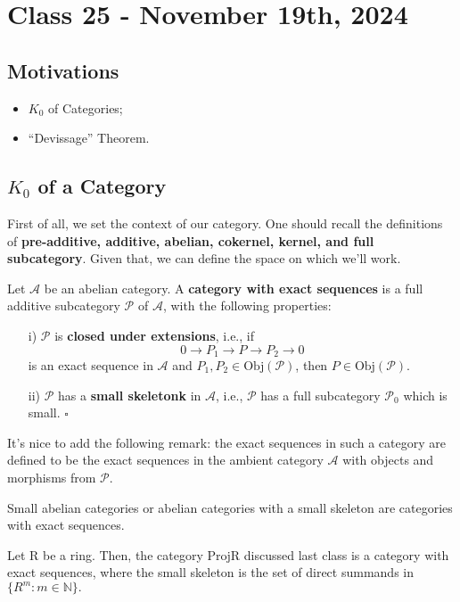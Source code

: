 \documentclass[../category_theory.tex]{subfiles}
\begin{document}
\section{Class 25 - November 19th, 2024}
\subsection{Motivations}
\begin{itemize}
	\item \(K_{0}\) of Categories;
	\item ``Devissage'' Theorem.
\end{itemize}
\subsection{\(K_{0}\) of a Category}
First of all, we set the context of our category. One should recall the definitions of \textbf{pre-additive, additive, abelian, cokernel, kernel, and full subcategory}.
Given that, we can define the space on which we'll work.
\begin{def*}
	Let \(\mathcal{A}\) be an abelian category. A \textbf{category with exact sequences} is a full additive subcategory \(\mathcal{P}\) of \(\mathcal{A}\), with the following properties:
	\begin{itemize}
		\item[i)] \(\mathcal{P}\) is \textbf{closed under extensions}, i.e., if
		      \[
			      0\rightarrow P_{1}\rightarrow P\rightarrow P_{2}\rightarrow 0
		      \]
		      is an exact sequence in \(\mathcal{A}\) and \(P_{1}, P_{2}\in \mathrm{Obj}(\mathcal{P})\), then \(P\in \mathrm{Obj}(\mathcal{P})\).
		\item[ii)] \(\mathcal{P}\) has a \textbf{small skeletonk} in \(\mathcal{A}\), i.e., \(\mathcal{P}\) has a full subcategory \(\mathcal{P}_{0}\) which is small. \(\square\)
	\end{itemize}
\end{def*}
It's nice to add the following remark: the exact sequences in such a category are defined to be the exact sequences in the ambient category \(\mathcal{A}\) with objects and morphisms from \(\mathcal{P}.\)
\begin{example}
	Small abelian categories or abelian categories with a small skeleton are categories with exact sequences.
\end{example}
\begin{example}
	Let R be a ring. Then, the category \(\mathrm{Proj R}\) discussed last class is a category with exact sequences, where the small skeleton is the set of direct summands in \(\{R^{m}: m\in \mathbb{N}\}.\)
\end{example}
\end{document}
